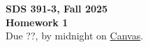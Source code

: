 \documentclass[12pt]{article}
\begin{document}
\begin{center}
{\bf SDS 391-3, Fall 2025 \\
 Homework 1}\\
 \vspace{5pt}
 Due ??, by midnight on \href{https://canvas.utexas.edu/index.html}{Canvas}.
\end{center}

%
%



\begin{enumerate}




\end{enumerate}
\end{document}
